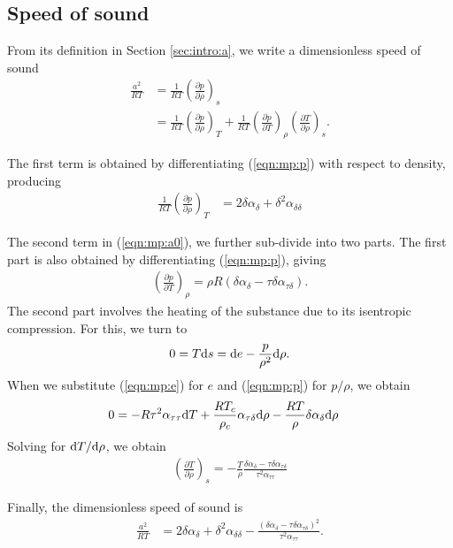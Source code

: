 \subsection{Speed of sound}

From its definition in Section \ref{sec:intro:a}, we write a dimensionless speed of sound
\begin{align}
\frac{a^2}{R T} &= \frac{1}{RT} \left(\frac{\partial p}{\partial \rho}\right)_s\nonumber\\
  &= \frac{1}{RT} \left(\frac{\partial p}{\partial \rho}\right)_T + \frac{1}{RT} \left(\frac{\partial p}{\partial T}\right)_\rho\left(\frac{\partial T}{\partial \rho}\right)_s. \label{eqn:mp:a0}
\end{align}

The first term is obtained by differentiating (\ref{eqn:mp:p}) with respect to density, producing
\begin{align}
\frac{1}{RT} \left(\frac{\partial p}{\partial \rho}\right)_T &= 2 \delta \alpha_\delta + \delta^2 \alpha_{\delta\delta}
\end{align}

The second term in (\ref{eqn:mp:a0}), we further sub-divide into two parts.  The first part is also obtained by differentiating (\ref{eqn:mp:p}), giving
\begin{align}
\left(\frac{\partial p}{\partial T}\right)_\rho = \rho R (\delta \alpha_\delta - \tau \delta \alpha_{\tau \delta}).
\end{align}
The second part involves the heating of the substance due to its isentropic compression.  For this, we turn to 
\begin{align*}
0 = T \mathrm{d} s = \mathrm{d} e - \frac{p}{\rho^2}\mathrm{d} \rho.
\end{align*}
When we substitute (\ref{eqn:mp:e}) for $e$ and (\ref{eqn:mp:p}) for $p/\rho$, we obtain
\begin{align*}
0 &= -R \tau^2 \alpha_{\tau\tau} \mathrm{d} T + \frac{R T_c}{\rho_c} \alpha_{\tau\delta} \mathrm{d} \rho - \frac{RT}{\rho} \delta \alpha_\delta \mathrm{d} \rho
\end{align*}
Solving for $\mathrm{d} T / \mathrm{d} \rho$, we obtain
\begin{align}
\left(\frac{\partial T}{\partial \rho}\right)_s = -\frac{T}{\rho}\frac{\delta\alpha_\delta - \tau\delta\alpha_{\tau\delta}}{\tau^2 \alpha_{\tau\tau}}
\end{align}

Finally, the dimensionless speed of sound is
\begin{align}
\frac{a^2}{RT} &= 2\delta \alpha_\delta + \delta^2 \alpha_{\delta\delta} - \frac{(\delta \alpha_\delta - \tau\delta \alpha_{\tau\delta})^2}{\tau^2\alpha_{\tau\tau}}.\label{eqn:mp:a}
\end{align}

